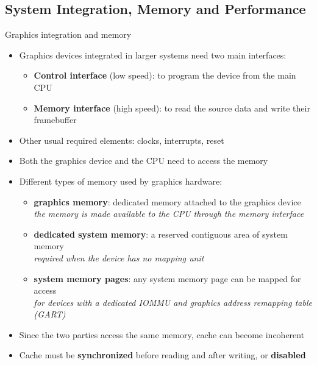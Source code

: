 \subsection{System Integration, Memory and Performance}

\begin{frame}{Graphics integration and memory}
  \begin{itemize}
  \item Graphics devices integrated in larger systems need two main interfaces:
    \begin{itemize}
    \item \textbf{Control interface} (low speed): to program the device from the main CPU
    \item \textbf{Memory interface} (high speed): to read the source data and write their framebuffer
    \end{itemize}
  \item Other usual required elements: clocks, interrupts, reset
  \item Both the graphics device and the CPU need to access the memory
  \item Different types of memory used by graphics hardware:
    \begin{itemize}
    \item \textbf{graphics memory}: dedicated memory attached to the graphics device\\
    \textit{the memory is made available to the CPU through the memory interface}
    \item \textbf{dedicated system memory}: a reserved contiguous area of system memory\\
    \textit{required when the device has no mapping unit}
    \item \textbf{system memory pages}: any system memory page can be mapped for access\\
    \textit{for devices with a dedicated IOMMU and graphics address remapping table (GART)}
    \end{itemize}
  \item Since the two parties access the same memory, cache can become incoherent
  \item Cache must be \textbf{synchronized} before reading and after writing, or \textbf{disabled}
  \end{itemize}
\end{frame}

